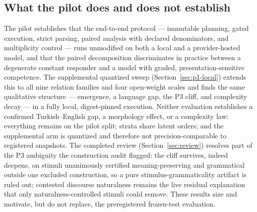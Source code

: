 \subsection{What the pilot does and does not establish}

The pilot establishes that the end-to-end protocol --- immutable planning, gated execution, strict
parsing, paired analysis with declared denominators, and multiplicity control --- runs unmodified on both
a local and a provider-hosted model, and that the paired decomposition discriminates in practice between a
degenerate constant responder and a model with graded, presentation-sensitive competence. The
supplemental quantized sweep (Section~\ref{sec:p1-local}) extends this to all nine relation families and
four open-weight scales and finds the same qualitative structure --- emergence, a language gap, the P3
cliff, and complexity decay --- in a fully local, digest-pinned execution. Neither evaluation establishes
a confirmed Turkish--English gap, a morphology effect, or a complexity law: everything remains on the
pilot split; strata share latent orders; and the supplemental arm is quantized and therefore not
precision-comparable to registered snapshots. The completed review (Section~\ref{sec:review}) resolves
part of the P3 ambiguity the construction audit flagged: the cliff survives, indeed deepens, on stimuli
unanimously certified meaning-preserving and grammatical outside one excluded construction, so a pure
stimulus-grammaticality artifact is ruled out; contested discourse naturalness remains the live residual
explanation that only naturalness-controlled stimuli could remove. These results size and motivate, but
do not replace, the preregistered frozen-test
evaluation.

